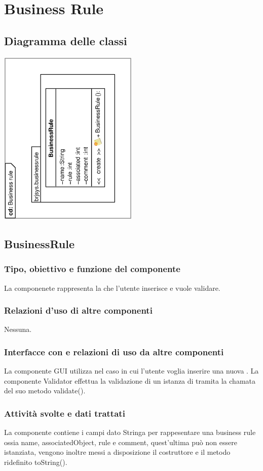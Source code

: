 \documentclass[11pt,titlepage,a4paper]{report}
\begin{document}
\section{Business Rule}
\subsection{Diagramma delle classi}
\begin{center}
\includegraphics[width=0.5\textwidth, angle=-90]{DiagrammaClassi/Businessrule.eps}
\end{center}
\subsection{BusinessRule}
\subsubsection{Tipo, obiettivo e funzione del componente}
La componenete \BR rappresenta la \br che l'utente inserisce e vuole validare.
\subsubsection{Relazioni d'uso di altre componenti}
Nessuna.
\subsubsection{Interfacce con e relazioni di uso da altre componenti}
La componente GUI utilizza \BR nel caso in cui l'utente voglia inserire una nuova \br.
La componente Validator effettua la validazione di un istanza di \BR tramita la chamata del suo metodo validate().
\subsubsection{Attivit\`a svolte e dati trattati}
La componente contiene i campi dato Stringa per rappesentare una business rule ossia name, associatedObject, rule e comment, quest'ultima può non essere istanziata, vengono inoltre messi a disposizione il costruttore e il metodo ridefinito toString().
\end{document}
